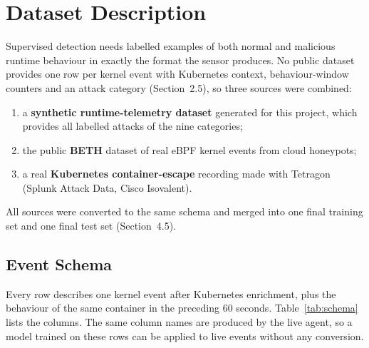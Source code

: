 \chapter{Dataset Description}

Supervised detection needs labelled examples of both normal and malicious runtime
behaviour in exactly the format the sensor produces. No public dataset provides one
row per kernel event with Kubernetes context, behaviour-window counters and an attack
category (Section~2.5), so three sources were combined:
\begin{enumerate}
    \item a \textbf{synthetic runtime-telemetry dataset} generated for this project, which
          provides all labelled attacks of the nine categories;
    \item the public \textbf{BETH} dataset of real eBPF kernel events from cloud honeypots;
    \item a real \textbf{Kubernetes container-escape} recording made with Tetragon
          (Splunk Attack Data, Cisco Isovalent).
\end{enumerate}
All sources were converted to the same schema and merged into one final training set
and one final test set (Section~4.5).

\section{Event Schema}

Every row describes one kernel event after Kubernetes enrichment, plus the behaviour of
the same container in the preceding 60 seconds. Table~\ref{tab:schema} lists the
columns. The same column names are produced by the live agent, so a model trained on
these rows can be applied to live events without any conversion.

